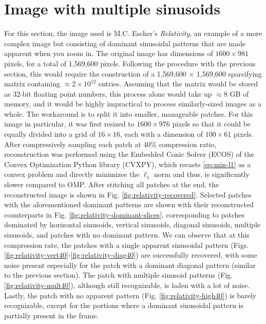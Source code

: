 \section{Image with multiple sinusoids}
\label{sec:2dmultisin}
For this section, the image used is M.C. Escher's \textit{Relativity}, an example of a more complex image but consisting of dominant sinusoidal patterns that are made apparent when you zoom in. The original image has dimensions of $1600 \times 981$ pixels, for a total of 1,569,600 pixels. Following the procedure with the previous section, this would require the construction of a 1,569,600 $\times$ 1,569,600 sparsifying matrix containing $\approx 2 \times 10^{12}$ entries. Assuming that the matrix would be stored as 32-bit floating point numbers, this process alone would take up $\approx 8$ GB of memory, and it would be highly impractical to process similarly-sized images as a whole. The workaround is to split it into smaller, manageable patches. For this image in particular, it was first resized to $1600 \times 976$ pixels so that it could be equally divided into a grid of $16 \times 16$, each with a dimension of $100 \times 61$ pixels. After compressively sampling each patch at 40\% compression ratio, reconstruction was performed using the Embedded Conic Solver (ECOS) of the Convex Optimization Python library (CVXPY), which recasts \eqref{eq:min-l1} as a convex problem and directly minimizes the $\ell_1$ norm \cite{ecos,cvxpy,cvxpy_rewriting} and thus, is significantly slower compared to OMP. After stitching all patches at the end, the reconstructed image is shown in Fig. \ref{fig:relativity-recovered}. Selected patches with the aforementioned dominant patterns are shown with their reconstructed counterparts in Fig. \ref{fig:relativity-dominant-slices}, corresponding to patches dominated by horizontal sinusoids, vertical sinusoids, diagonal sinusoids, multiple sinusoids, and patches with no dominant pattern. We can observe that at this compression rate, the patches with a single apparent sinusoidal pattern (Figs. \ref{fig:relativity-vert40}-\ref{fig:relativity-diag40}) are successfully recovered, with some noise present especially for the patch with a dominant diagonal pattern (similar to the previous section). The patch with multiple sinusoid patterns (Fig. \ref{fig:relativity-mult40}), although still recognizable, is laden with a lot of noise. Lastly, the patch with no apparent pattern (Fig. \ref{fig:relativity-high40}) is barely recognizable, except for the portions where a dominant sinusoidal pattern is partially present in the frame.

